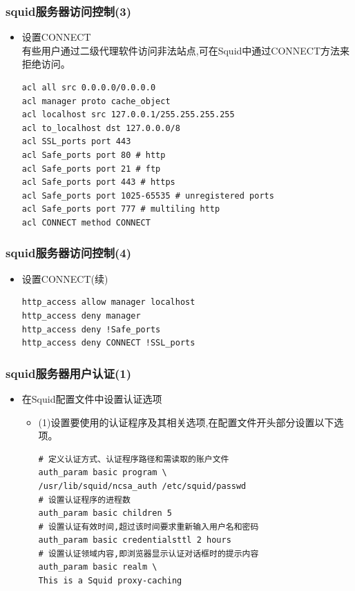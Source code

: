 \documentclass[xcolor=svgnames,presentation]{beamer}
\begin{document}
\begin{frame}[fragile]
\frametitle{squid服务器访问控制(3)}
\label{sec-4-12}
\begin{itemize}

\item 设置CONNECT\\
\label{sec-4-12-1}%
有些用户通过二级代理软件访问非法站点,可在Squid中通过CONNECT方法来拒绝访问。

\begin{verbatim}
acl all src 0.0.0.0/0.0.0.0
acl manager proto cache_object
acl localhost src 127.0.0.1/255.255.255.255
acl to_localhost dst 127.0.0.0/8
acl SSL_ports port 443
acl Safe_ports port 80 # http
acl Safe_ports port 21 # ftp
acl Safe_ports port 443 # https
acl Safe_ports port 1025-65535 # unregistered ports
acl Safe_ports port 777 # multiling http
acl CONNECT method CONNECT
\end{verbatim}
\end{itemize} %
\end{frame}
\begin{frame}[fragile]
\frametitle{squid服务器访问控制(4)}
\label{sec-4-13}
\begin{itemize}

\item 设置CONNECT(续)\\
\label{sec-4-13-1}%
\begin{verbatim}
http_access allow manager localhost
http_access deny manager
http_access deny !Safe_ports
http_access deny CONNECT !SSL_ports
\end{verbatim}




\end{itemize} %
\end{frame}
\begin{frame}[fragile]
\frametitle{squid服务器用户认证(1)}
\label{sec-4-14}
\begin{itemize}

\item 在Squid配置文件中设置认证选项
\label{sec-4-14-1}%
\begin{itemize}

\item (1)设置要使用的认证程序及其相关选项,在配置文件开头部分设置以下选项。\\
\label{sec-4-14-1-1}%
\begin{verbatim}
# 定义认证方式、认证程序路径和需读取的账户文件
auth_param basic program \
/usr/lib/squid/ncsa_auth /etc/squid/passwd
# 设置认证程序的进程数
auth_param basic children 5
# 设置认证有效时间,超过该时间要求重新输入用户名和密码
auth_param basic credentialsttl 2 hours
# 设置认证领域内容,即浏览器显示认证对话框时的提示内容
auth_param basic realm \
This is a Squid proxy-caching
\end{verbatim}
\end{itemize} %
\end{itemize} %
\end{frame}
\end{document}
